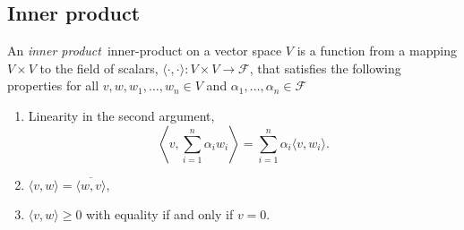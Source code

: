 \subsection{Inner product}


\begin{definition} \label{def:inner_product}
An \emph{inner product}~\gls{inner-product} on a vector space $V$ is a function from a mapping $V\times V$ to the field of scalars, $\langle \cdot, \cdot \rangle : V \times V \rightarrow \mathcal{F}$,  that satisfies the following properties for all $v, w, w_1, \ldots, w_n \in V$ and $\alpha_1, \ldots, \alpha_n \in \mathcal{F}$

\begin{enumerate}
  \item Linearity in the second argument,$$ \left\langle v, \sum_{i=1}^n \alpha_i w_i\right\rangle = \sum_{i=1}^n \alpha_i \langle v, w_i\rangle. $$
  \item $\langle v,w \rangle = \overline{\langle w,v \rangle} $, 
  \item  $\langle v,w \rangle \geq 0 $ with equality if and only if $v = 0$.
\end{enumerate}
\end{definition}


